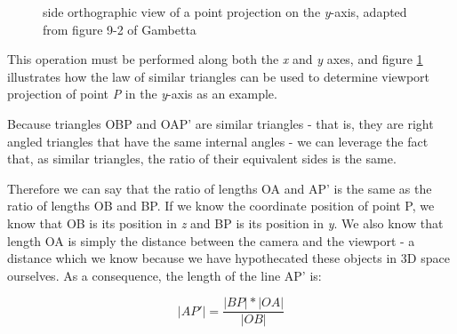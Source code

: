\documentclass[11pt]{article}
\begin{document}
\begin{figure}
   \centering
   \caption{side orthographic view of a point projection on the \textit{y}-axis, adapted from figure 9-2 of Gambetta
   \cite[p. 106]{gambetta}}
   \label{fig:triangles}
\end{figure}

This operation must be performed along both the \textit{x} and \textit{y} axes, and figure \ref{fig:triangles}
illustrates how the law of similar triangles can be used to determine viewport projection of point \textit{P}
in the \textit{y}-axis as an example. \cite[p. 106]{gambetta}

Because triangles OBP and OAP' are similar triangles - that is, they are right angled triangles that have the same
internal angles - we can leverage the fact that, as similar triangles, the ratio of their equivalent sides is the same.

Therefore we can say that the ratio of lengths OA and AP' is the same as the ratio of lengths OB and BP. If we know
the coordinate position of point P, we know that OB is its position in \textit{z} and BP is its position in \textit{y}.
We also know that length OA is simply the distance between the camera and the viewport - a distance which we know because
we have hypothecated these objects in 3D space ourselves. As a consequence, the length of the line AP' is:

\begin{equation}
   |AP'| = \frac{|BP| * |OA|} {|OB|}
\end{equation}
\end{document}
